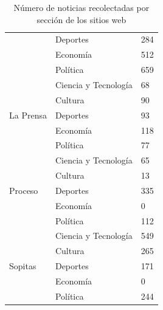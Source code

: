\begin{table}[H]
\begin{tabular}{|l|l|l|}
                                    & Deportes             & 284                \\ \cline{2-3} 
                                    & Economía             & 512                \\ \cline{2-3} 
                                    & Política             & 659                \\ \hline
\multirow{5}{*}{La Prensa}          & Ciencia y Tecnología & 68                 \\ \cline{2-3} 
                                    & Cultura              & 90                 \\ \cline{2-3} 
                                    & Deportes             & 93                 \\ \cline{2-3} 
                                    & Economía             & 118                \\ \cline{2-3} 
                                    & Política             & 77                 \\ \hline
\multirow{5}{*}{Proceso}            & Ciencia y Tecnología & 65                 \\ \cline{2-3} 
                                    & Cultura              & 13                 \\ \cline{2-3} 
                                    & Deportes             & 335                \\ \cline{2-3} 
                                    & Economía             & 0                  \\ \cline{2-3} 
                                    & Política             & 112                \\ \hline
\multirow{5}{*}{Sopitas}            & Ciencia y Tecnología & 549                \\ \cline{2-3} 
                                    & Cultura              & 265                \\ \cline{2-3} 
                                    & Deportes             & 171                \\ \cline{2-3} 
                                    & Economía             & 0                  \\ \cline{2-3} 
                                    & Política             & 244                \\ \hline
\end{tabular}
\caption[Noticias recolectadas por sitio web]{Número de noticias recolectadas por sección de los sitios web}
\label{tabla:numNotic}
\end{table}

